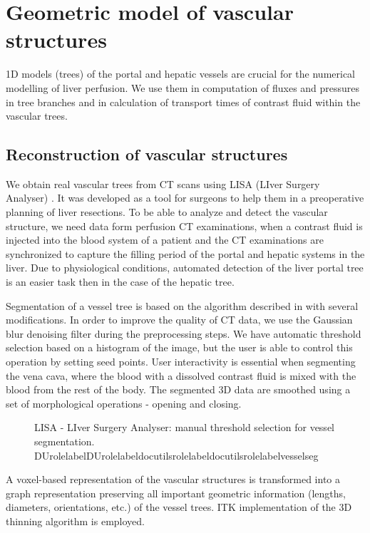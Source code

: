 \documentclass[letterpaper,compsoc,twoside]{IEEEtran}
\providecommand*{\DUrole}[2]{\ifcsname DUrole#1\endcsname \csname DUrole#1\endcsname{#2}\else \ifcsname docutilsrole#1\endcsname \csname docutilsrole#1\endcsname{#2}\else #2\fi \fi }
\begin{document}
\section{Geometric model of vascular structures\label{geometric-model-of-vascular-structures}}


1D models (trees) of the portal and hepatic vessels are crucial for
the numerical modelling of liver perfusion. We use them in computation
of fluxes and pressures in tree branches and in calculation of
transport times of contrast fluid within the vascular trees.

\subsection{Reconstruction of vascular structures\label{reconstruction-of-vascular-structures}}


We obtain real vascular trees from CT scans using LISA (LIver Surgery
Analyser) \cite{Jir14}. It was developed as a tool for surgeons to help them
in a preoperative planning of liver resections. To be able to analyze
and detect the vascular structure, we need data form perfusion CT
examinations, when a contrast fluid is injected into the blood system
of a patient and the CT examinations are synchronized to capture the
filling period of the portal and hepatic systems in the liver. Due to
physiological conditions, automated detection of the liver portal tree
is an easier task then in the case of the hepatic tree.

Segmentation of a vessel tree is based on the algorithm described in
\cite{Sel02} with several modifications. In order to improve the quality
of CT data, we use the Gaussian blur denoising filter during the
preprocessing steps. We have automatic threshold selection based on a
histogram of the image, but the user is able to control this operation
by setting seed points. User interactivity is essential when
segmenting the vena cava, where the blood with a dissolved contrast
fluid is mixed with the blood from the rest of the body. The segmented
3D data are smoothed using a set of morphological operations - opening
and closing.\begin{figure}[]\noindent{}
\caption{LISA - LIver Surgery Analyser: manual threshold selection for
vessel segmentation. \DUrole{label}{vesselseg}}
\end{figure}

A voxel-based representation of the vascular structures is transformed
into a graph representation preserving all important geometric
information (lengths, diameters, orientations, etc.) of the vessel
trees. ITK implementation of the 3D thinning algorithm \cite{Hom07} is
employed.
\end{document}
